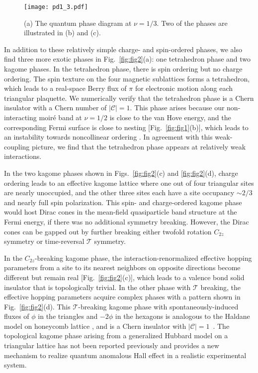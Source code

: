 \documentclass[aps,prl,floatfix,twocolumn]{revtex4-1}
\begin{document}
\begin{figure}[t]
	\centering
	\texttt{[image: pd1\_3.pdf]}
	\caption{(a) The quantum phase diagram at $ \nu=1/3 $. Two of the phases are illustrated in (b) and (c).}
	\label{fig:pd1,3}
\end{figure}


In addition to these relatively simple charge- and spin-ordered phases, we also find three more exotic phases in Fig.~\ref{fig:fig2}(a): one tetrahedron phase and two kagome phases. In the tetrahedron phase, there is spin ordering but no charge ordering. The spin texture on the four magnetic sublattices forms a tetrahedron, which leads to a real-space Berry flux of $\pi$ for electronic motion along each triangular plaquette. We numerically verify that the tetrahedron phase is a Chern insulator with a Chern number of $|\mathcal{C}|=1$. This phase arises because our non-interacting moir\'e band at $\nu=1/2$ is close to the van Hove energy, and the corresponding Fermi surface is close to nesting [Fig.~\ref{fig:fig1}(b)], which leads to an instability towards noncollinear ordering \cite{martin2008itinerant}. In agreement with this weak-coupling picture, we find that the tetrahedron phase appears at relatively weak interactions.

In the two kagome phases shown in Figs.~\ref{fig:fig2}(c) and \ref{fig:fig2}(d), charge ordering leads to an effective kagome lattice where one out of four triangular sites are nearly unoccupied, and the other three sites each have a site occupancy $\sim 2/3$ and nearly full spin polarization. This spin- and charge-ordered kagome phase would host Dirac cones in the mean-field quasiparticle band structure at the Fermi energy, if there was no additional symmetry breaking. However, the Dirac cones can be gapped out by further breaking either twofold rotation $C_{2z}$ symmetry or time-reversal $\mathcal{T}$ symmetry. 

In the $C_{2z}$-breaking kagome phase, the interaction-renormalized effective hopping parameters from a site to its nearest neighbors on opposite directions become different but remain real [Fig.~\ref{fig:fig2}(c)], which leads to a valence bond solid insulator that is topologically trivial. In the other phase with $\mathcal{T}$ breaking, the effective hopping parameters acquire complex phases with a pattern shown in Fig.~\ref{fig:fig2}(d). This $\mathcal{T}$-breaking kagome phase with spontaneously-induced fluxes of $ \phi $ in the triangles and $ -2\phi $ in the hexagons is analogous to the Haldane model on honeycomb lattice \cite{haldane1988model}, and is a Chern insulator with $|\mathcal{C}|=1$~\cite{SM}. The topological kagome phase arising from a generalized Hubbard model on a triangular lattice has not been reported previously and provides a new mechanism to realize quantum anomalous Hall effect in a realistic experimental system.
\end{document}
